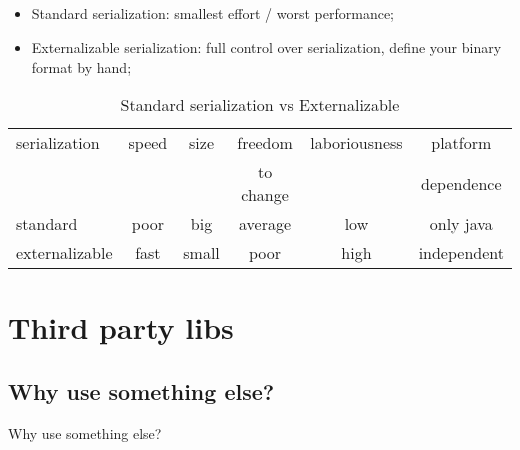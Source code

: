 \documentclass[8pt]{beamer}
\begin{document}
\subsection{\partname}
\begin{frame}{\partname}
  \begin{itemize}
    \item Standard serialization: smallest effort / worst performance;
    \item Externalizable serialization: full control over
    serialization, define your binary format by hand;
  \end{itemize}
  \begin{table}
    \begin{tabular}{l | c | c | c | c | c }
      serialization  & speed & size & freedom & laboriousness & platform \\
      &       &      & to change &               & dependence\\
      \hline \hline
      standard       & poor & big   & average & low  & only java  \\
      \hline
      externalizable & fast & small & poor    & high & independent
    \end{tabular}

    \caption{Standard serialization vs Externalizable}
  \end{table}

\end{frame}

\section{Third party libs}
\renewcommand{\partname}{Why use something else?}
\subsection{\partname}
\begin{frame}{\partname}
\end{frame}
\end{document}
